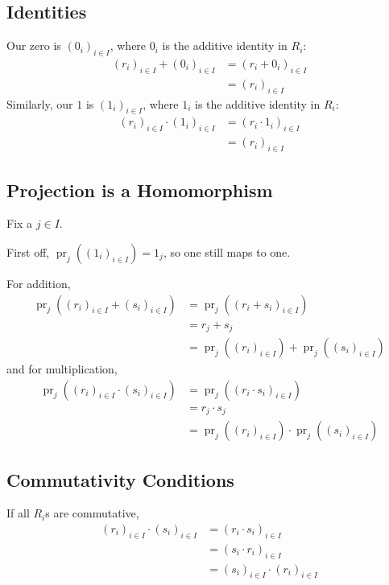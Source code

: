 \documentclass[12pt]{article}
\DeclareMathOperator{\pr}{pr}
\begin{document}
\subsection{Identities}

Our zero is $(0_i)_{i \in I}$, where $0_i$ is the additive identity in $R_i$:
\begin{align*}
  (r_i)_{i \in I}+(0_i)_{i \in I}
   & = (r_i+0_i)_{i \in I} \\
   & = (r_i)_{i \in I}
\end{align*}
Similarly, our $1$ is $(1_i)_{i \in I}$, where $1_i$ is the additive identity in $R_i$:
\begin{align*}
  (r_i)_{i \in I} \cdot (1_i)_{i \in I}
   & = (r_i \cdot 1_i)_{i \in I} \\
   & = (r_i)_{i \in I}
\end{align*}

\subsection{Projection is a Homomorphism}

Fix a $j \in I$.

First off, $\pr_j((1_i)_{i \in I})=1_j$, so one still maps to one.

For addition,
\begin{align*}
  \pr_j((r_i)_{i \in I}+(s_i)_{i \in I})
   & =\pr_j((r_i+s_i)_{i \in I})                     \\
   & = r_j+s_j                                       \\
   & = \pr_j((r_i)_{i \in I})+\pr_j((s_i)_{i \in I})
\end{align*}
and for multiplication,
\begin{align*}
  \pr_j((r_i)_{i \in I} \cdot (s_i)_{i \in I})
   & = \pr_j((r_i \cdot s_i)_{i \in I})                    \\
   & = r_j \cdot s_j                                       \\
   & = \pr_j((r_i)_{i \in I}) \cdot \pr_j((s_i)_{i \in I})
\end{align*}

\subsection{Commutativity Conditions}

If all $R_i$s are commutative,
\begin{align*}
  (r_i)_{i \in I} \cdot (s_i)_{i \in I}
   & = (r_i \cdot s_i)_{i \in I}             \\
   & = (s_i \cdot r_i)_{i \in I}             \\
   & = (s_i)_{i \in I} \cdot (r_i)_{i \in I}
\end{align*}
\end{document}
